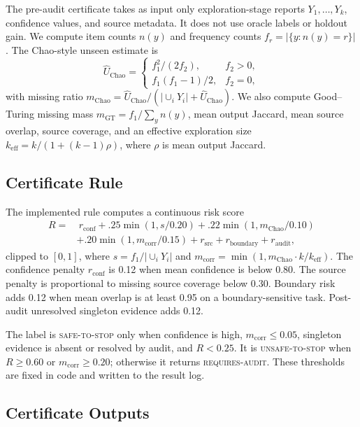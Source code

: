 \documentclass[letterpaper]{article}
\begin{document}
The pre-audit certificate takes as input only exploration-stage reports
$Y_1,\ldots,Y_k$, confidence values, and source metadata. It does not use oracle
labels or holdout gain. We compute item counts $n(y)$ and frequency counts
$f_r=|\{y:n(y)=r\}|$. The Chao-style unseen estimate is
\begin{equation}
\hat{U}_{\text{Chao}} =
\begin{cases}
f_1^2/(2f_2), & f_2>0,\\
f_1(f_1-1)/2, & f_2=0,
\end{cases}
\end{equation}
with missing ratio
$m_{\text{Chao}}=\hat{U}_{\text{Chao}}/(|\cup_iY_i|+\hat{U}_{\text{Chao}})$.
We also compute Good--Turing missing mass $m_{\text{GT}}=f_1/\sum_y n(y)$,
mean output Jaccard, mean source overlap, source coverage, and an effective
exploration size $k_{\text{eff}}=k/(1+(k-1)\rho)$, where $\rho$ is mean output
Jaccard.

\subsection{Certificate Rule}

The implemented rule computes a continuous risk score
\begin{align}
R = &\ r_{\text{conf}} + .25\min(1,s/0.20)
      + .22\min(1,m_{\text{Chao}}/0.10) \nonumber\\
    &+ .20\min(1,m_{\text{corr}}/0.15)
      + r_{\text{src}} + r_{\text{boundary}} + r_{\text{audit}},
\end{align}
clipped to $[0,1]$, where $s=f_1/|\cup_iY_i|$ and
$m_{\text{corr}}=\min(1,m_{\text{Chao}}\cdot k/k_{\text{eff}})$. The confidence
penalty $r_{\text{conf}}$ is 0.12 when mean confidence is below 0.80. The source
penalty is proportional to missing source coverage below 0.30. Boundary risk
adds 0.12 when mean overlap is at least 0.95 on a boundary-sensitive task.
Post-audit unresolved singleton evidence adds 0.12.

The label is \textsc{safe-to-stop} only when confidence is high,
$m_{\text{corr}}\le0.05$, singleton evidence is absent or resolved by audit, and
$R<0.25$. It is \textsc{unsafe-to-stop} when $R\ge0.60$ or
$m_{\text{corr}}\ge0.20$; otherwise it returns \textsc{requires-audit}. These
thresholds are fixed in code and written to the result log.

\subsection{Certificate Outputs}
\end{document}
